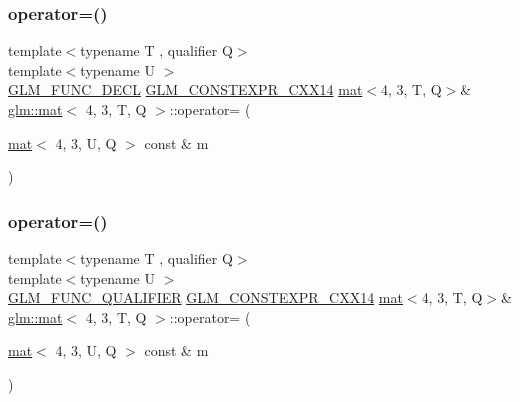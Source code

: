 \subsubsection{\texorpdfstring{operator=()}{operator=()}\hspace{0.1cm}{\footnotesize\ttfamily [2/3]}}
{\footnotesize\ttfamily template$<$typename T , qualifier Q$>$ \\
template$<$typename U $>$ \\
\hyperlink{setup_8hpp_ab2d052de21a70539923e9bcbf6e83a51}{G\+L\+M\+\_\+\+F\+U\+N\+C\+\_\+\+D\+E\+CL} \hyperlink{setup_8hpp_a4dd12abf5e1164bc57f3a34671d03844}{G\+L\+M\+\_\+\+C\+O\+N\+S\+T\+E\+X\+P\+R\+\_\+\+C\+X\+X14} \hyperlink{structglm_1_1mat}{mat}$<$4, 3, T, Q$>$\& \hyperlink{structglm_1_1mat}{glm\+::mat}$<$ 4, 3, T, Q $>$\+::operator= (\begin{DoxyParamCaption}\item[{\hyperlink{structglm_1_1mat}{mat}$<$ 4, 3, U, Q $>$ const \&}]{m }\end{DoxyParamCaption})}

\mbox{\label{structglm_1_1mat_3_014_00_013_00_01_t_00_01_q_01_4_aa924cf798f7324b172ca31f969fd02e4}} 
\subsubsection{\texorpdfstring{operator=()}{operator=()}\hspace{0.1cm}{\footnotesize\ttfamily [3/3]}}
{\footnotesize\ttfamily template$<$typename T , qualifier Q$>$ \\
template$<$typename U $>$ \\
\hyperlink{setup_8hpp_a33fdea6f91c5f834105f7415e2a64407}{G\+L\+M\+\_\+\+F\+U\+N\+C\+\_\+\+Q\+U\+A\+L\+I\+F\+I\+ER} \hyperlink{setup_8hpp_a4dd12abf5e1164bc57f3a34671d03844}{G\+L\+M\+\_\+\+C\+O\+N\+S\+T\+E\+X\+P\+R\+\_\+\+C\+X\+X14} \hyperlink{structglm_1_1mat}{mat}$<$4, 3, T, Q$>$\& \hyperlink{structglm_1_1mat}{glm\+::mat}$<$ 4, 3, T, Q $>$\+::operator= (\begin{DoxyParamCaption}\item[{\hyperlink{structglm_1_1mat}{mat}$<$ 4, 3, U, Q $>$ const \&}]{m }\end{DoxyParamCaption})}



